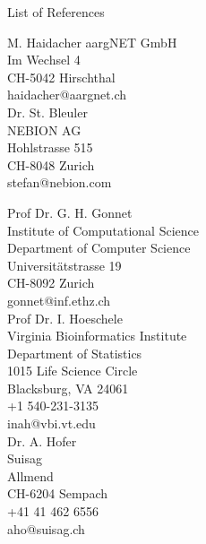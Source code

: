 \documentclass[11pt,a4paper]{scrartcl}
\begin{document}
\begin{center}
\Large{List of References}
\end{center}


\vspace{2ex}
\noindent M. Haidacher
aargNET GmbH\\
Im Wechsel 4\\
CH-5042 Hirschthal\\
haidacher@aargnet.ch\\

\noindent Dr. St. Bleuler\\
NEBION AG\\
Hohlstrasse 515\\
CH-8048 Zurich\\
stefan@nebion.com

\vspace{2ex}
\noindent Prof Dr. G. H. Gonnet \\
Institute of Computational Science \\
Department of Computer Science \\
Universit\"atstrasse 19 \\
CH-8092 Zurich\\
gonnet@inf.ethz.ch\\

\vspace{2ex}
\noindent Prof Dr. I. Hoeschele\\
Virginia Bioinformatics Institute\\
Department of Statistics\\
1015 Life Science Circle\\
Blacksburg, VA 24061\\
+1 540-231-3135\\
inah@vbi.vt.edu\\

\vspace{2ex}
\noindent Dr. A. Hofer \\
Suisag \\
Allmend \\
CH-6204 Sempach \\
+41 41 462 6556 \\
aho@suisag.ch
\end{document}
